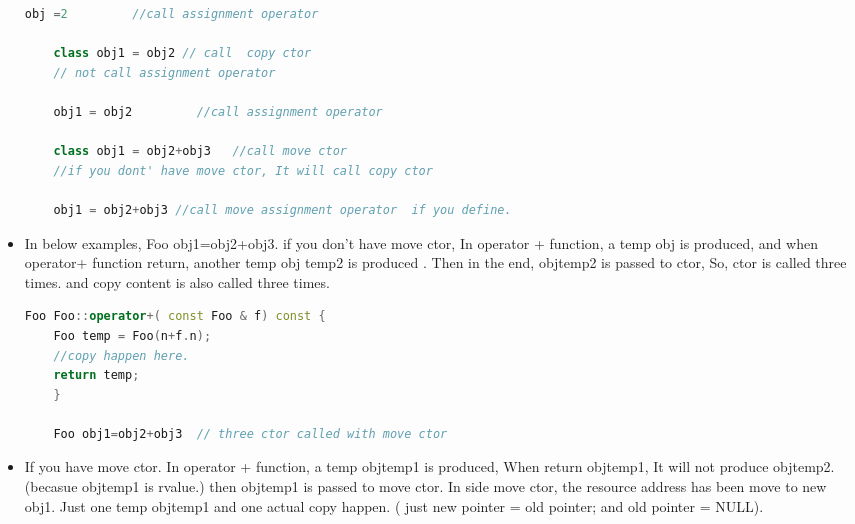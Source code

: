 \documentclass[a4paper,12pt,twoside]{book}
\begin{document}
\begin{itemize}
\begin{lstlisting}[frame=single, language=c++]
	obj =2         //call assignment operator
	
	class obj1 = obj2 // call  copy ctor
	// not call assignment operator
	
	obj1 = obj2         //call assignment operator
	
	class obj1 = obj2+obj3   //call move ctor
	//if you dont' have move ctor, It will call copy ctor
	
	obj1 = obj2+obj3 //call move assignment operator  if you define.
	\end{lstlisting}
	
	\item In below examples, Foo obj1=obj2+obj3. if you don't have move ctor, In operator + function, a temp obj is produced,  and when operator+ function return, another temp obj temp2 is produced .  Then in the end, objtemp2 is passed to ctor,  So, ctor is called three times. and copy content is also called three times.
	
	\begin{lstlisting}[frame=single, language=c++]
	Foo Foo::operator+( const Foo & f) const {
	Foo temp = Foo(n+f.n);
	//copy happen here.
	return temp;
	}
	
	Foo obj1=obj2+obj3  // three ctor called with move ctor
	\end{lstlisting}
	
	\item If you have move ctor. In operator + function, a temp objtemp1 is produced,  When return objtemp1, It will not produce objtemp2. (becasue objtemp1 is rvalue.) then objtemp1 is passed to move ctor. In side move ctor, the resource address has been move to new obj1.  Just one temp objtemp1 and one actual copy happen. ( just new pointer = old pointer; and old pointer = NULL).
\end{itemize}
\end{document}
